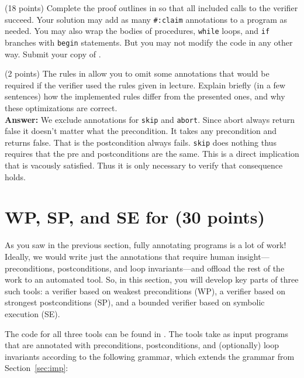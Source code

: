 \documentclass{handout}
\begin{document}
\begin{questions}
\item (18 points) \label{prob:hoare-proofs} Complete the proof outlines in
 so that all included calls to the verifier succeed. Your
solution may add as many \lstinline{#:claim} annotations to a program as needed.
You may also wrap the bodies of procedures, \lstinline{while} loops, and
\lstinline{if} branches with \lstinline{begin} statements. But you may not
modify the code in any other way. Submit your copy of .



\item (2 points) \label{prob:hoare-study} The rules in 
allow you to omit some annotations that would be required if the verifier used
the rules given in lecture. Explain briefly (in a few sentences) how the
implemented rules differ from the presented ones, and why these optimizations
are correct. \\

\textbf{Answer:} We exclude annotations for \lstinline{skip} and \lstinline{abort}. Since abort always return false it doesn't matter what the precondition. It takes any precondition and returns false. That is the postcondition always fails. \lstinline{skip} does nothing thus requires that the pre and postconditions are the same. This is a direct implication that is vacously satisfied. Thus it is only necessary to verify that consequence holds. 






\end{questions}

\section{WP, SP, and SE for \imp (30 points)}\label{sec:imp:wp/sp/se}

As you saw in the previous section, fully annotating programs is a lot of work!
Ideally, we would write just the annotations that require human
insight---preconditions, postconditions, and loop invariants---and offload the
rest of the work to an automated tool. So, in this section, you will develop key
parts of three such tools: a verifier based on weakest preconditions (WP), a
verifier based on strongest postconditions (SP), and a bounded verifier based on
symbolic execution (SE).

The code for all three tools can be found in . The tools
take as input \imp programs that are annotated with preconditions,
postconditions, and (optionally) loop invariants according to the following
grammar, which extends the grammar from Section~\ref{sec:imp}:
\end{document}
